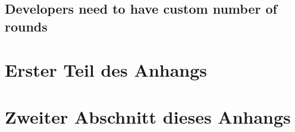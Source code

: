 \begin{appendix}
\subsection{Developers need to have custom number of rounds}

\section{Erster Teil des Anhangs}

\section{Zweiter Abschnitt dieses Anhangs}

\end{appendix}





